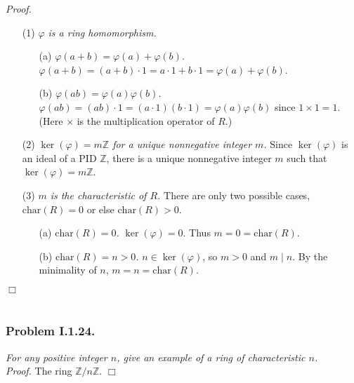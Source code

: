\documentclass{article}
\begin{document}
\emph{Proof.}
\begin{enumerate}
\item[(1)]
  \emph{$\varphi$ is a ring homomorphism.}
  \begin{enumerate}
  \item[(a)]
    \emph{$\varphi(a+b) = \varphi(a) + \varphi(b)$.}
    $\varphi(a+b)
    = (a+b) \cdot 1
    = a \cdot 1 + b \cdot 1
    = \varphi(a) + \varphi(b)$.
  \item[(b)]
    \emph{$\varphi(ab) = \varphi(a) \varphi(b)$.}
    $\varphi(ab)
    = (ab) \cdot 1
    = (a \cdot 1)(b \cdot 1)
    = \varphi(a) \varphi(b)$
    since $1 \times 1 = 1$. (Here $\times$ is the multiplication operator of $R$.)
  \end{enumerate}
\item[(2)]
  \emph{$\ker(\varphi) = m\mathbb{Z}$ for a unique nonnegative integer $m$.}
  Since $\ker(\varphi)$ is an ideal of a PID $\mathbb{Z}$,
  there is a unique nonnegative integer $m$
  such that $\ker(\varphi) = m\mathbb{Z}$.
\item[(3)]
  \emph{$m$ is the characteristic of $R$.}
  There are only two possible cases,
  $\text{char}(R) = 0$ or else $\text{char}(R) > 0$.
  \begin{enumerate}
  \item[(a)]
    \emph{$\text{char}(R) = 0$.}
    $\ker(\varphi) = 0$. Thus $m = 0 = \text{char}(R)$.
  \item[(b)]
    \emph{$\text{char}(R) = n > 0$.} $n \in \ker(\varphi)$,
    so $m > 0$ and $m \mid n$.
    By the minimality of $n$, $m = n = \text{char}(R)$.
  \end{enumerate}
\end{enumerate}
$\Box$ \\\\






\subsubsection*{Problem I.1.24.}
\emph{For any positive integer $n$,
give an example of a ring of characteristic $n$.} \\

\emph{Proof.}
The ring $\mathbb{Z}/n\mathbb{Z}$.
$\Box$ \\\\
\end{document}
